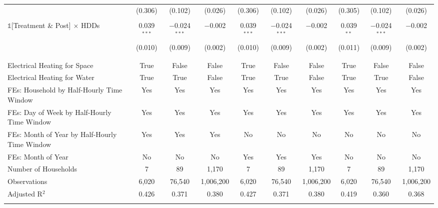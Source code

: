 \begin{table}[!htbp]
\begin{tabular}{@{\extracolsep{20pt}}lccccccccc}
  & (0.306) & (0.102) & (0.026) & (0.306) & (0.102) & (0.026) & (0.305) & (0.102) & (0.026) \\ 
  & & & & & & & & & \\ 
 $\mathbb{1}$[Treatment \& Post] $\times$ HDDs & 0.039$^{***}$ & $-$0.024$^{***}$ & $-$0.002 & 0.039$^{***}$ & $-$0.024$^{***}$ & $-$0.002 & 0.039$^{**}$ & $-$0.024$^{***}$ & $-$0.002 \\ 
  & (0.010) & (0.009) & (0.002) & (0.010) & (0.009) & (0.002) & (0.011) & (0.009) & (0.002) \\ 
  & & & & & & & & & \\ 
\hline \\[-1.8ex] 
Electrical Heating for Space & True & False & False & True & False & False & True & False & False \\ 
Electrical Heating for Water & True & True & False & True & True & False & True & True & False \\ 
FEs: Household by Half-Hourly Time Window & Yes & Yes & Yes & Yes & Yes & Yes & Yes & Yes & Yes \\ 
FEs: Day of Week by Half-Hourly Time Window & Yes & Yes & Yes & Yes & Yes & Yes & Yes & Yes & Yes \\ 
FEs: Month of Year by Half-Hourly Time Window & Yes & Yes & Yes & No & No & No & No & No & No \\ 
FEs: Month of Year & No & No & No & Yes & Yes & Yes & No & No & No \\ 
Number of Households &     7 &    89 & 1,170 &     7 &    89 & 1,170 &     7 &    89 & 1,170 \\ 
Observations & 6,020 & 76,540 & 1,006,200 & 6,020 & 76,540 & 1,006,200 & 6,020 & 76,540 & 1,006,200 \\ 
Adjusted R$^{2}$ & 0.426 & 0.371 & 0.380 & 0.427 & 0.371 & 0.380 & 0.419 & 0.360 & 0.368 \\ 
\hline 
\hline \\[-1.8ex] 
\end{tabular} 
\end{table} 
